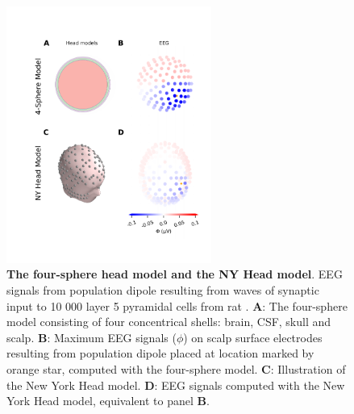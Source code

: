 \documentclass[preprint,11pt,authoryear]{elsarticle}
\newcommand{\hlj}[2][OliveGreen]{ {\sethlcolor{#1} \hl{#2}} }
\newcommand{\hlR}[2][red]{ {\sethlcolor{#1} \hl{#2}} }
\newcommand{\gen}[1]{\color{white}{\hlR{GTE: #1 }}\color{black}}
\newcommand{\tvnnote}[1]{\color{white}{\hlj{TVN: #1 }}\color{black}}
\begin{document}
\begin{figure}[!ht]
\begin{center}
\includegraphics[width=0.6\textwidth]{head_models.pdf}
\end{center}
\caption{\textbf{The four-sphere head model and the NY Head model}. EEG signals from population dipole resulting from waves of synaptic input to 10 000 layer 5 pyramidal cells from rat \citep{Hay2011}.
	{\bf A}: The four-sphere model consisting of four concentrical shells: brain, CSF, skull and scalp. 
	{\bf B}: Maximum EEG signals ($\phi$) on scalp surface electrodes resulting from population dipole placed at location marked by orange star, computed with the four-sphere model.
	{\bf C}: Illustration of the New York Head model.
	{\bf D}: EEG signals computed with the New York Head model, equivalent to panel {\bf B}.
}
\label{fig:head_models}
\end{figure}


%



\end{document}
